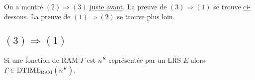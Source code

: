 \documentclass{report}
\newcommand{\dtimeramarg}[1]{\text{DTIME}_{\text{RAM}}\left( n^{#1} \right)}
\begin{document}
	On a montré $(2) \Rightarrow (3)$ \hyperref[conj:rep_LSRS_rep_LRS]{juste avant}. 
	La preuve de $(3) \Rightarrow (1)$ se trouve \hyperref[conj:rep_LRS_calc_n_K]{ci-dessous}.
	La preuve de $(1) \Rightarrow (2)$ se trouve \hyperref[conj:poly_implique_LSRS]{plus loin}.
	
	
	\subsection{$(3) \Rightarrow (1)$}
		\label{subsec:LRS_implique_poly}
		
		\begin{conj}
			\label{conj:rep_LRS_calc_n_K}
			Si une fonction de RAM $\Gamma$ est $n^K$-représentée par un LRS $E$ alors $\Gamma \in \dtimeramarg{K}$.
		\end{conj}
		
\end{document}
